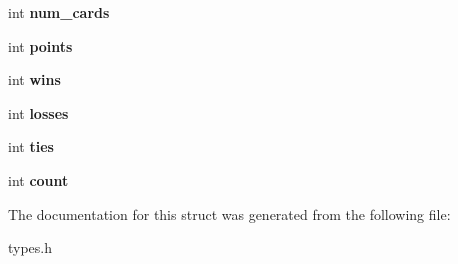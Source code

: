 \begin{DoxyCompactItemize}
\item 
\hypertarget{struct_player_a83bd29acbedad8704d10a21cc81c195a}{int {\bfseries num\-\_\-cards}}\label{struct_player_a83bd29acbedad8704d10a21cc81c195a}

\item 
\hypertarget{struct_player_adf0398ea8c1f29175204508ab642b64e}{int {\bfseries points}}\label{struct_player_adf0398ea8c1f29175204508ab642b64e}

\item 
\hypertarget{struct_player_aba7987685c25a4189ae664e9748eecf0}{int {\bfseries wins}}\label{struct_player_aba7987685c25a4189ae664e9748eecf0}

\item 
\hypertarget{struct_player_ace5ff4004042482c503755ca591fd8fd}{int {\bfseries losses}}\label{struct_player_ace5ff4004042482c503755ca591fd8fd}

\item 
\hypertarget{struct_player_afbb174e79c08653125685786c9ed93b1}{int {\bfseries ties}}\label{struct_player_afbb174e79c08653125685786c9ed93b1}

\item 
\hypertarget{struct_player_ab73c55ffa8a115bd6c58b7ea1c5428af}{int {\bfseries count}}\label{struct_player_ab73c55ffa8a115bd6c58b7ea1c5428af}

\end{DoxyCompactItemize}


The documentation for this struct was generated from the following file\-:\begin{DoxyCompactItemize}
\item 
types.\-h\end{DoxyCompactItemize}
